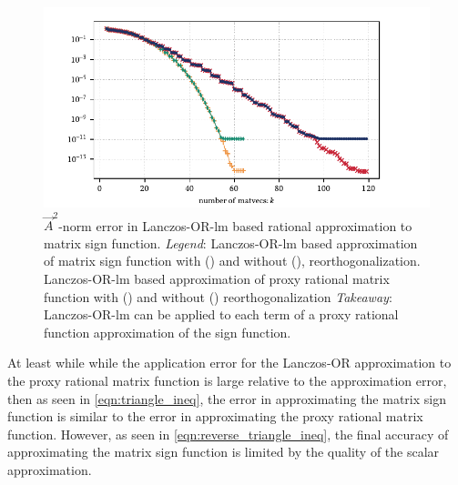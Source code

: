 \begin{figure}[ht]
    \begin{center}
        \includegraphics{imgs/ch6_sign_rat.pdf} 
    \end{center}
    \caption[{$\vec{A}^2$-norm error in Lanczos-OR-lm based rational approximation to matrix sign function.}]{%
    $\vec{A}^2$-norm error in Lanczos-OR-lm based rational approximation to matrix sign function.
    \hspace{.25em}\textit{Legend}:
    Lanczos-OR-lm based approximation of matrix sign function with
    ({\protect{}})
    and without 
    ({\protect{}}), 
    reorthogonalization.
    Lanczos-OR-lm based approximation of proxy rational matrix function with
    ({\protect{}})
    and without 
    ({\protect{}})
    reorthogonalization
    \hspace{.25em}\textit{Takeaway}: Lanczos-OR-lm can be applied to each term of a proxy rational function approximation of the sign function.
    }
    \label{fig:ch6_sign_rat}
\end{figure}


At least while while the application error for the Lanczos-OR approximation to the proxy rational matrix function is large relative to the approximation error, then as seen in \cref{eqn:triangle_ineq}, the error in approximating the matrix sign function is similar to the error in approximating the proxy rational matrix function.
However, as seen in \cref{eqn:reverse_triangle_ineq}, the final accuracy of approximating the matrix sign function is limited by the quality of the scalar approximation.

